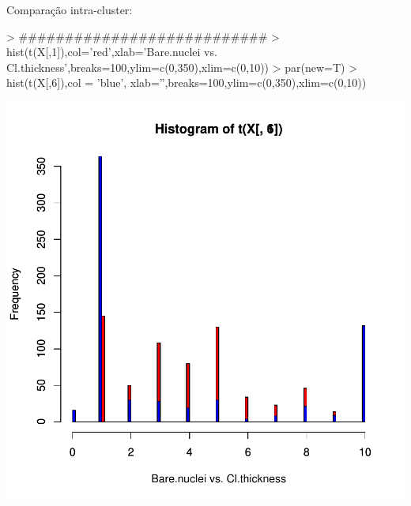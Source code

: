 \documentclass{article}
\begin{document}
Comparação intra-cluster:
\begin{Schunk}
\begin{Sinput}
> ###########################
> hist(t(X[,1]),col='red',xlab='Bare.nuclei vs. Cl.thickness',breaks=100,ylim=c(0,350),xlim=c(0,10))
> par(new=T)
> hist(t(X[,6]),col = 'blue', xlab='',breaks=100,ylim=c(0,350),xlim=c(0,10))
\end{Sinput}
\end{Schunk}
\includegraphics{selecao-016}
\end{document}
